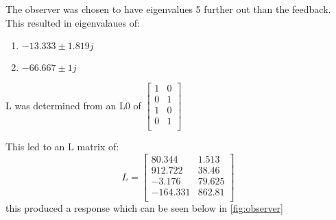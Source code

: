 The observer was chosen to have eigenvalues 5 further out than the feedback. This resulted in eigenvalaues of:\begin{enumerate}
\item$-13.333 \pm 1.819j$\\
\item$-66.667 \pm 1j$\end{enumerate}
L was determined from an L0 of $\begin{bmatrix}
1&0\\
0&1\\
1&0\\
0&1\\
\end{bmatrix}
$

This led to an L matrix of: \begin{equation}L = \begin{bmatrix}
80.344&1.513\\
912.722&38.46\\
-3.176&79.625\\
-164.331&862.81\\
\end{bmatrix}
\end{equation}this produced a response which can be seen below in \autoref{fig:observer}
